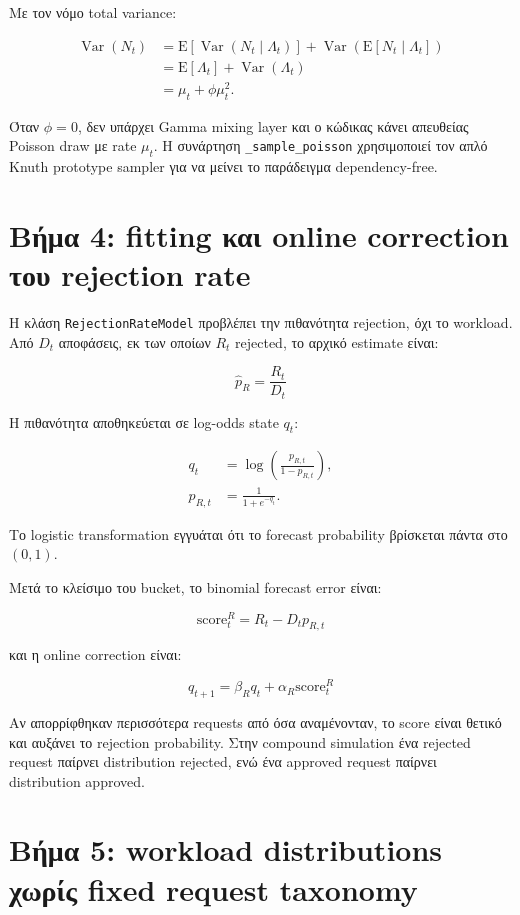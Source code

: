 \documentclass[11pt,a4paper]{article}
\newcommand{\equationnote}[1]{
  \begin{center}
    \colorbox{boxblue}{\parbox{0.92\linewidth}{\begin{equation*}#1\end{equation*}}}
  \end{center}
}
\newcommand{\code}[1]{\texttt{#1}}
\begin{document}
Με τον νόμο total variance:

\begin{align*}
  \operatorname{Var}(N_t)
    &= \mathrm{E}[\operatorname{Var}(N_t\mid\Lambda_t)]
      +\operatorname{Var}(\mathrm{E}[N_t\mid\Lambda_t])\\
    &= \mathrm{E}[\Lambda_t]+\operatorname{Var}(\Lambda_t)\\
    &= \mu_t+\phi\mu_t^2.
\end{align*}

Όταν $\phi=0$, δεν υπάρχει Gamma mixing layer και ο κώδικας κάνει απευθείας
Poisson draw με rate $\mu_t$. Η συνάρτηση \code{\_sample\_poisson} χρησιμοποιεί
τον απλό Knuth prototype sampler για να μείνει το παράδειγμα dependency-free.

\section{Βήμα 4: fitting και online correction του rejection rate}

Η κλάση \code{RejectionRateModel} προβλέπει την πιθανότητα rejection, όχι
το workload. Από $D_t$ αποφάσεις, εκ των οποίων $R_t$ rejected, το αρχικό
estimate είναι:

\equationnote{\hat{p}_{R} = \frac{R_t}{D_t}}

Η πιθανότητα αποθηκεύεται σε log-odds state $q_t$:

\begin{align*}
  q_t &= \log\left(\frac{p_{R,t}}{1-p_{R,t}}\right),\\
  p_{R,t} &= \frac{1}{1+e^{-q_t}}.
\end{align*}

Το logistic transformation εγγυάται ότι το forecast probability βρίσκεται
πάντα στο $(0,1)$.

Μετά το κλείσιμο του bucket, το binomial forecast error είναι:

\equationnote{\text{score}^{R}_t = R_t-D_t p_{R,t}}

και η online correction είναι:

\equationnote{q_{t+1}=\beta_Rq_t+\alpha_R\text{score}^{R}_t}

Αν απορρίφθηκαν περισσότερα requests από όσα αναμένονταν, το score είναι
θετικό και αυξάνει το rejection probability. Στην compound simulation ένα
rejected request παίρνει distribution rejected, ενώ ένα approved request
παίρνει distribution approved.

\section{Βήμα 5: workload distributions χωρίς fixed request taxonomy}
\end{document}
